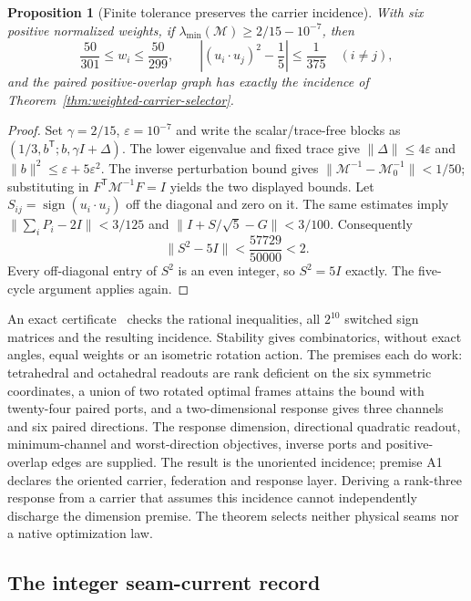 \documentclass[11pt]{article}
\newtheorem{proposition}[theorem]{Proposition}
\theoremstyle{remark}
\theoremstyle{plain}
\begin{document}
\begin{proposition}[Finite tolerance preserves the carrier incidence]
With six positive normalized weights, if
$\lambda_{\min}(\mathcal M)\ge2/15-10^{-7}$, then
\[
 \frac{50}{301}\le w_i\le\frac{50}{299},\qquad
 \left|(u_i\cdot u_j)^2-\frac15\right|\le\frac1{375}\quad(i\ne j),
\]
and the paired positive-overlap graph has exactly the incidence of
Theorem~\ref{thm:weighted-carrier-selector}.
\end{proposition}
\begin{proof}
Set $\gamma=2/15$, $\varepsilon=10^{-7}$ and write the scalar/trace-free
blocks as $(1/3,b^{\mathsf T};b,\gamma I+\Delta)$. The lower eigenvalue
and fixed trace give $\|\Delta\|\le4\varepsilon$ and
$\|b\|^2\le\varepsilon+5\varepsilon^2$. The inverse perturbation bound
gives $\|\mathcal M^{-1}-\mathcal M_0^{-1}\|<1/50$; substituting in
$F^{\mathsf T}\mathcal M^{-1}F=I$ yields the two displayed bounds.
Let $S_{ij}=\operatorname{sign}(u_i\cdot u_j)$ off the diagonal and zero
on it. The same estimates imply
$\|\sum_iP_i-2I\|<3/125$ and
$\|I+S/\sqrt5-G\|<3/100$. Consequently
\[
 \|S^2-5I\|<\frac{57729}{50000}<2.
\]
Every off-diagonal entry of $S^2$ is an even integer, so $S^2=5I$
exactly. The five-cycle argument applies again.
\end{proof}

An exact certificate~\cite{ophrepo} checks
the rational inequalities, all $2^{10}$ switched sign matrices and the
resulting incidence. Stability gives combinatorics, without exact angles,
equal weights or an isometric rotation action. The premises each do work:
tetrahedral and octahedral readouts are rank deficient on the six symmetric
coordinates, a union of two rotated optimal frames attains the bound with
twenty-four paired ports, and a two-dimensional response gives three channels
and six paired directions. The response dimension, directional quadratic
readout, minimum-channel and worst-direction objectives, inverse ports and
positive-overlap edges are supplied. The result is the unoriented incidence;
premise A1 declares the oriented carrier, federation and response layer.
Deriving a rank-three response from a carrier that assumes this incidence
cannot independently discharge the dimension premise. The theorem selects
neither physical seams nor a native optimization law.

\subsection{The integer seam-current record}
\end{document}
